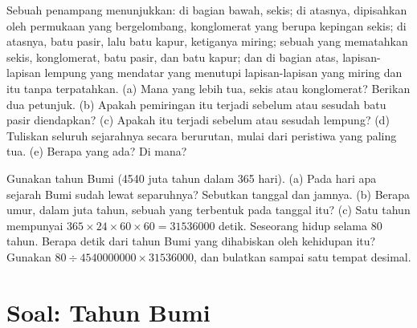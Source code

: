 \begin{exercise}[$\star\star\star$]\label{exo:g7:geological-time:11}
Sebuah penampang menunjukkan: di bagian bawah, sekis; di atasnya,
dipisahkan oleh permukaan  yang bergelombang, konglomerat yang
 berupa kepingan sekis; di atasnya, batu pasir, lalu batu kapur,
ketiganya miring; sebuah  yang mematahkan sekis, konglomerat, batu
pasir, dan batu kapur; dan di bagian atas, lapisan-lapisan lempung yang
mendatar yang menutupi lapisan-lapisan yang miring dan  itu tanpa
terpatahkan. (a) Mana yang lebih tua, sekis atau konglomerat? Berikan dua
petunjuk. (b) Apakah pemiringan itu terjadi sebelum atau sesudah batu pasir
diendapkan? (c) Apakah  itu terjadi sebelum atau sesudah lempung?
(d) Tuliskan seluruh sejarahnya secara berurutan, mulai dari peristiwa
yang paling tua. (e) Berapa  yang ada? Di mana?
\end{exercise}

\begin{exercise}[$\star\star\star$]\label{exo:g7:geological-time:12}
Gunakan tahun Bumi (\num{4540} juta tahun dalam 365 hari). (a) Pada hari
apa sejarah Bumi sudah lewat separuhnya? Sebutkan tanggal dan jamnya.
(b) Berapa umur, dalam juta tahun, sebuah  yang terbentuk pada
tanggal itu? (c) Satu tahun mempunyai $365 \times 24 \times 60 \times 60 = \num{31536000}$
detik. Seseorang hidup selama 80 tahun. Berapa detik dari tahun Bumi
yang dihabiskan oleh kehidupan itu? Gunakan $80 \div \num{4540000000} \times
\num{31536000}$, dan bulatkan sampai satu tempat desimal.
\end{exercise}

\section{Soal: Tahun Bumi}

